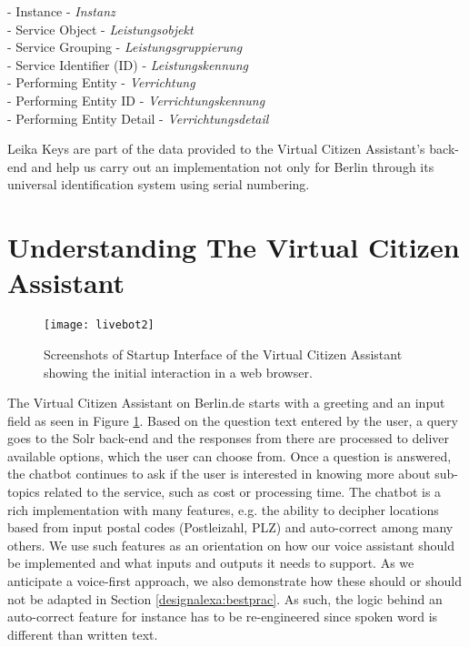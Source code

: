 \begin{flushleft}
- Instance \quad \quad \quad \quad \quad \quad \space \space  - \textit{Instanz}\\
- Service Object \quad \quad \quad  \space \space \space \space - \textit{Leistungsobjekt}\\
- Service Grouping \quad \quad \space \space \space - \textit{Leistungsgruppierung}\\
- Service Identifier (ID)   \space \space \space \space- \textit{Leistungskennung}\\
- Performing Entity \quad \quad \space \space - \textit{Verrichtung}\\
- Performing Entity ID \quad \space - \textit{Verrichtungskennung}\\
- Performing Entity Detail  - \textit{Verrichtungsdetail}\\
\end{flushleft}

\clearpage
Leika Keys are part of the data provided to the Virtual Citizen Assistant's back-end and help us carry out an implementation not only for Berlin through its universal identification system using serial numbering.


\section{Understanding The Virtual Citizen Assistant}




\begin{figure}[H]
	\centering
	\caption[Startup Interface of the Virtual Citizen Assistant]{Screenshots of Startup Interface of the Virtual Citizen Assistant showing the initial interaction in a web browser.}
	\label{vca:start}
	\texttt{[image: livebot2]}
\end{figure}


The Virtual Citizen Assistant on Berlin.de starts with a greeting and an input field as seen in Figure \ref{vca:start}. Based on the question text entered by the user, a query goes to the Solr back-end and the responses from there are processed to deliver available options, which the user can choose from.
Once a question is answered, the chatbot continues to ask if the user is interested in knowing more about sub-topics related to the service, such as cost or processing time.
The chatbot is a rich implementation with many features, e.g. the ability to decipher locations based from input postal codes (Postleizahl, PLZ) and auto-correct among many others. We use such %
features as an orientation on how our voice assistant should be implemented and what inputs and outputs it needs to support. As we anticipate a voice-first approach, we also demonstrate how these should or should not be adapted in Section \ref{designalexa:bestprac}. As such, the logic behind an auto-correct feature for instance has to be re-engineered since spoken word is different than written text.\\

